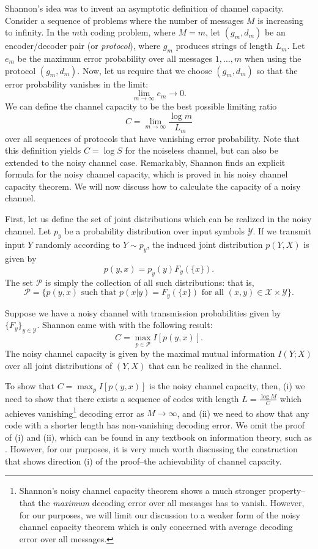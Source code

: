 Shannon's idea was to invent an asymptotic definition of channel
capacity.  Consider a sequence of problems where the number of
messages $M$ is increasing to infinity.  In the $m$th coding problem,
where $M = m$, let $(g_m, d_m)$ be an encoder/decoder pair (or \emph{protocol}), where
$g_m$ produces strings of length $L_m$.  Let $e_m$ be the maximum
error probability over all messages $1,\hdots, m$ when using the
protocol $(g_m, d_m)$.  Now, let us require that we choose $(g_m,
d_m)$ so that the error probability vanishes in the limit:
\[
\lim_{m \to \infty} e_m \to 0.
\]
We can define the channel capacity to be the best possible limiting ratio
\[
C = \lim_{m \to \infty} \frac{\log m}{L_m}
\]
over all sequences of protocols that have vanishing error probability.
Note that this definition yields $C = \log S$ for the noiseless
channel, but can also be extended to the noisy channel case.
Remarkably, Shannon finds an explicit formula for the noisy channel
capacity, which is proved in his noisy channel capacity theorem.  We
will now discuss how to calculate the capacity of a noisy channel.

First, let us define the set of joint distributions which can be
realized in the noisy channel.  Let $p_y$ be a probability
distribution over input symbols $\mathcal{Y}$.  If we transmit input
$Y$ randomly according to $Y \sim p_y$, the induced joint distribution
$p(Y, X)$ is given by
\[
p(y, x) = p_y(y) F_y(\{x\}).
\]
The set $\mathcal{P}$ is simply the collection of all such distributions: that is,
\[
\mathcal{P} = \{p(y, x) \text{ such that } p(x|y) = F_y(\{x\})\text{ for all }(x, y) \in \mathcal{X} \times \mathcal{Y}\}.
\]

Suppose we have a noisy channel with transmission probabilities given by $\{F_y\}_{y \in \mathcal{Y}}$.
Shannon came with with the following result:
\[
C = \max_{p\in \mathcal{P}} I[p(y, x)].
\]
The noisy channel capacity is given by the maximal mutual information
$I(Y; X)$ over all joint distributions of $(Y, X)$ that can be
realized in the channel.

To show that $C = \max_p I[p(y, x)]$ is the noisy channel capacity,
then, (i) we need to show that there exists a sequence of codes with
length $L = \frac{\log M}{C}$ which achieves
vanishing\footnote{Shannon's noisy channel capacity theorem shows a
  much stronger property--that the \emph{maximum} decoding error over
  all messages has to vanish.  However, for our purposes, we will
  limit our discussion to a weaker form of the noisy channel capacity
  theorem which is only concerned with average decoding error over all
  messages.} decoding error as $M \to \infty$, and (ii) we need to
show that any code with a shorter length has non-vanishing decoding
error.  We omit the proof of (i) and (ii), which can be found in any
textbook on information theory, such as \cite{Cover2006}.  However,
for our purposes, it is very much worth discussing the construction
that shows direction (i) of the proof--the achievability of channel
capacity.

